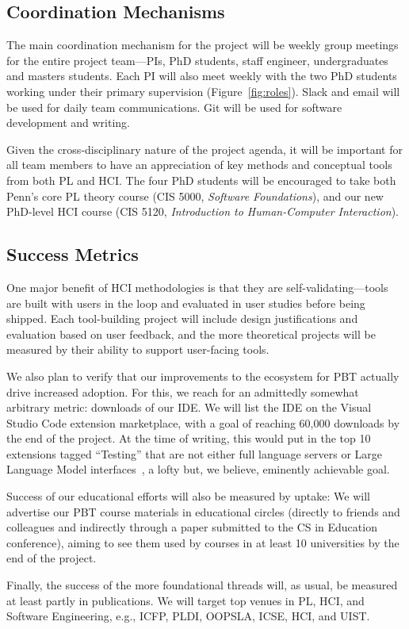 \subsection*{Coordination Mechanisms}

The main coordination mechanism for the project will be weekly group
meetings for the entire project team---PIs, PhD students, staff
engineer, undergraduates and masters students.
%
Each PI will also meet weekly with the two PhD students working under
their primary supervision (Figure~\ref{fig:roles}).
%
Slack and email will be used for daily team communications.  Git will
be used for software development and writing.

Given the cross-disciplinary nature of the project agenda, it will be
important for all team members to have an appreciation of key methods
and conceptual tools from both PL and HCI.  The four PhD students will
be encouraged to take both Penn's core PL theory course (CIS 5000,
{\em Software Foundations}), and our new PhD-level HCI course (CIS
5120, {\em Introduction to Human-Computer Interaction}).


\subsection*{Success Metrics}

One major benefit of
HCI methodologies is that they are self-validating---tools are built with users
in the loop and evaluated in user studies before being shipped.
Each tool-building project will include design justifications and
evaluation based on user feedback, and the more theoretical
projects will be measured by their ability to support user-facing tools.

We also plan to verify that our improvements to the ecosystem for PBT
actually drive increased adoption. For this, we reach for an
admittedly somewhat arbitrary metric: downloads of our \tyche{} IDE.
We will list the IDE on the Visual Studio Code extension marketplace,
with a goal of reaching 60,000 downloads by the end of the project. At
the time of writing, this would put \tyche{} in the top 10 extensions
tagged ``Testing'' that are not either full language servers or Large
Language Model interfaces~\cite{noauthor_testing_nodate}, a lofty but,
we believe, eminently achievable goal.

Success of our educational efforts will also be measured by uptake: We
will advertise our PBT course materials in educational circles
(directly to friends and colleagues and indirectly through a paper
submitted to the CS in Education conference), aiming to see them used
by courses in at least 10 universities by the end of the project.


Finally, the success of the more foundational threads will, as
usual, be measured at least partly in publications.  We will target
top venues in PL, HCI, and Software Engineering, e.g., ICFP, PLDI,
OOPSLA, ICSE, HCI, and UIST.  


\clearpage